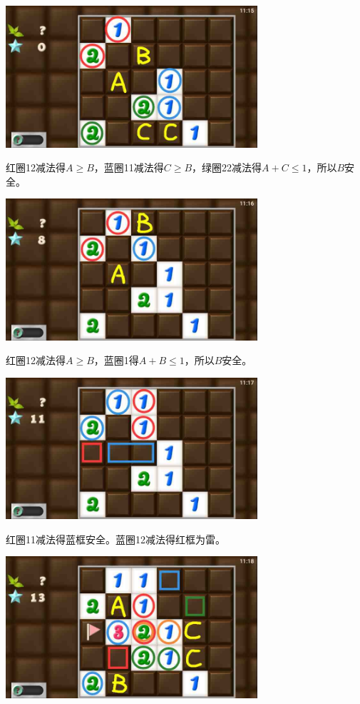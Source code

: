 \subsection{} %
\begin{center}
    \includegraphics[width=0.7\textwidth]{puzzlelow/215-1.jpg}
\end{center}
红圈12减法得$A\ge B$，蓝圈11减法得$C\ge B$，绿圈22减法得$A+C\le 1$，所以$B$安全。
\begin{center}
    \includegraphics[width=0.7\textwidth]{puzzlelow/215-2.jpg}
\end{center}
红圈12减法得$A\ge B$，蓝圈1得$A+B\le 1$，所以$B$安全。
\begin{center}
    \includegraphics[width=0.7\textwidth]{puzzlelow/215-3.jpg}
\end{center}
红圈11减法得蓝框安全。蓝圈12减法得红框为雷。
\begin{center}
    \includegraphics[width=0.7\textwidth]{puzzlelow/215-4.jpg}
\end{center}
